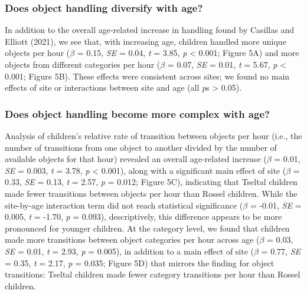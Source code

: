 \documentclass[10pt, letterpaper]{article}
\begin{document}
\hypertarget{does-object-handling-diversify-with-age}{%
\subsubsection{Does object handling diversify with
age?}\label{does-object-handling-diversify-with-age}}

In addition to the overall age-related increase in handling found by
Casillas and Elliott (2021), we see that, with increasing age, children
handled more unique objects per hour (\(\beta\) = 0.15, \emph{SE} =
0.04, \emph{t} = 3.85, \emph{p} \textless{} 0.001; Figure 5A) and more
objects from different categories per hour (\(\beta\) = 0.07, \emph{SE}
= 0.01, \emph{t} = 5.67, \emph{p} \textless{} 0.001; Figure 5B). These
effects were consistent across sites; we found no main effects of site
or interactions between site and age (all \emph{p}s \textgreater{}
0.05).\newline

\hypertarget{does-object-handling-become-more-complex-with-age}{%
\subsubsection{Does object handling become more complex with
age?}\label{does-object-handling-become-more-complex-with-age}}

Analysis of children's relative rate of transition between objects per
hour (i.e., the number of transitions from one object to another divided
by the number of available objects for that hour) revealed an overall
age-related increase (\(\beta\) = 0.01, \emph{SE} = 0.003, \emph{t} =
3.78, \emph{p} \textless{} 0.001), along with a significant main effect
of site (\(\beta\) = 0.33, \emph{SE} = 0.13, \emph{t} = 2.57, \emph{p} =
0.012; Figure 5C), indicating that Tseltal children made fewer
transitions between objects per hour than Rossel children. While the
site-by-age interaction term did not reach statistical significance
(\(\beta\) = -0.01, \emph{SE} = 0.005, \emph{t} = -1.70, \emph{p} =
0.093), descriptively, this difference appears to be more pronounced for
younger children. At the category level, we found that children made
more transitions between object categories per hour across age
(\(\beta\) = 0.03, \emph{SE} = 0.01, \emph{t} = 2.93, \emph{p} = 0.005),
in addition to a main effect of site (\(\beta\) = 0.77, \emph{SE} =
0.35, \emph{t} = 2.17, \emph{p} = 0.035; Figure 5D) that mirrors the
finding for object transitions: Tseltal children made fewer category
transitions per hour than Rossel children.
\end{document}
